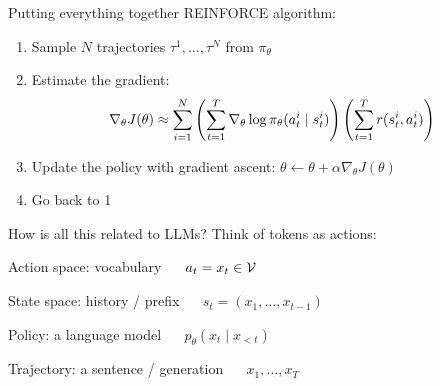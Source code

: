 \documentclass[usenames,dvipsnames,notes,11pt,aspectratio=169,hyperref={colorlinks=true, linkcolor=blue}]{beamer}
\begin{document}
\begin{frame}
    {Putting everything together}
    REINFORCE algorithm:\\
    \begin{enumerate}
        \item Sample $N$ trajectories $\tau^1,\ldots,\tau^N$ from $\pi_\theta$
        \item Estimate the gradient: 
            $$
            \nabla_\theta J(\theta) \approx \sum_{i=1}^N
            \left( \sum_{t=1}^T \nabla_\theta\log\pi_\theta(a_t^i\mid s_t^i) \right)
            \left( \sum_{t=1}^T r(s_t^i,a_t^i)  \right)
            $$
        \item Update the policy with gradient ascent: $\theta \leftarrow \theta + \alpha \nabla_\theta J(\theta)$
        \item Go back to 1
    \end{enumerate}
\end{frame}

\begin{frame}
    {How is all this related to LLMs?}{}
    Think of tokens as actions:\\
    \begin{wideitemize}
        \item Action space: vocabulary $\quad$ $a_t = x_t\in\mathcal{V}$
        \item State space: history / prefix $\quad$ $s_t = (x_1,\ldots,x_{t-1})$
        \item Policy: a language model $\quad$ $p_\theta(x_t\mid x_{<t})$
        \item Trajectory: a sentence / generation $\quad$ $x_1,\ldots,x_T$
    \end{wideitemize}
\end{frame}
\end{document}
